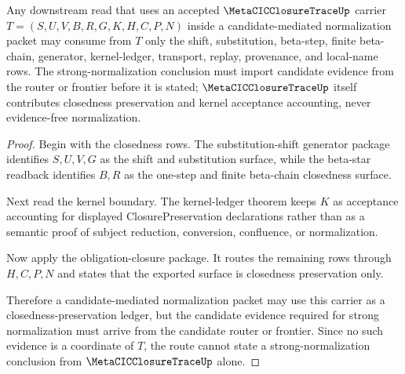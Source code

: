 \begin{theorem}
\label{thm:metacicclosuretrace-candidate-mediated-sn-route}
Any downstream read that uses an accepted $\MetaCICClosureTraceUp$ carrier $T=(S,U,V,B,R,G,K,H,C,P,N)$ inside a candidate-mediated normalization packet may consume from $T$ only the shift, substitution, beta-step, finite beta-chain, generator, kernel-ledger, transport, replay, provenance, and local-name rows. The strong-normalization conclusion must import candidate evidence from the router or frontier before it is stated; $\MetaCICClosureTraceUp$ itself contributes closedness preservation and kernel acceptance accounting, never evidence-free normalization.
\end{theorem}
\begin{proof}
Begin with the closedness rows. The substitution-shift generator package identifies $S,U,V,G$ as the shift and substitution surface, while the beta-star readback identifies $B,R$ as the one-step and finite beta-chain closedness surface.

Next read the kernel boundary. The kernel-ledger theorem keeps $K$ as acceptance accounting for displayed ClosurePreservation declarations rather than as a semantic proof of subject reduction, conversion, confluence, or normalization.

Now apply the obligation-closure package. It routes the remaining rows through $H,C,P,N$ and states that the exported surface is closedness preservation only.

Therefore a candidate-mediated normalization packet may use this carrier as a closedness-preservation ledger, but the candidate evidence required for strong normalization must arrive from the candidate router or frontier. Since no such evidence is a coordinate of $T$, the route cannot state a strong-normalization conclusion from $\MetaCICClosureTraceUp$ alone.
\end{proof}

